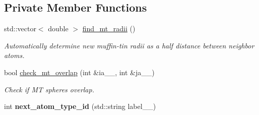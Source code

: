 \subsection*{Private Member Functions}
\begin{DoxyCompactItemize}
\item 
std\+::vector$<$ double $>$ \hyperlink{classsirius_1_1_unit__cell_a3d9c47a289473ff6f62b7190f1d752fe}{find\+\_\+mt\+\_\+radii} ()
\begin{DoxyCompactList}\small\item\em Automatically determine new muffin-\/tin radii as a half distance between neighbor atoms. \end{DoxyCompactList}\item 
bool \hyperlink{classsirius_1_1_unit__cell_af25aedf64bb12785e06333e2a58de315}{check\+\_\+mt\+\_\+overlap} (int \&ia\+\_\+\+\_\+, int \&ja\+\_\+\+\_\+)
\begin{DoxyCompactList}\small\item\em Check if M\+T spheres overlap. \end{DoxyCompactList}\item 
\hypertarget{classsirius_1_1_unit__cell_a84186f2ada194dc11b2313a260d2201c}{}int {\bfseries next\+\_\+atom\+\_\+type\+\_\+id} (std\+::string label\+\_\+\+\_\+)\label{classsirius_1_1_unit__cell_a84186f2ada194dc11b2313a260d2201c}

\end{DoxyCompactItemize}
